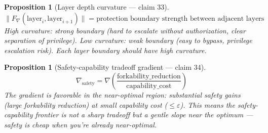 \documentclass[11pt,a4paper]{article}
\newtheorem{proposition}[definition]{Proposition}
\begin{document}
\begin{proposition}[Layer depth curvature --- claim 33]
\label{prop:layer_curv}
\[
  \|F_\nabla(\text{layer}_i, \text{layer}_{i+1})\| = \text{protection
    boundary strength between adjacent layers}
\]
High curvature: strong boundary (hard to escalate without
authorization, clear separation of privilege). Low curvature: weak
boundary (easy to bypass, privilege escalation risk). Each layer
boundary should have high curvature.
\end{proposition}

\begin{proposition}[Safety-capability tradeoff gradient --- claim 34]
\label{prop:safety_grad}
\[
  \nabla_{\text{safety}} = \nabla\left(\frac{\text{forkability\_reduction}}
    {\text{capability\_cost}}\right)
\]
The gradient is favorable in the near-optimal region: substantial
safety gains (large forkability reduction) at small capability cost
($\leq \varepsilon$). This means the safety-capability frontier is
not a sharp tradeoff but a gentle slope near the optimum --- safety
is cheap when you're already near-optimal.
\end{proposition}
\end{document}
